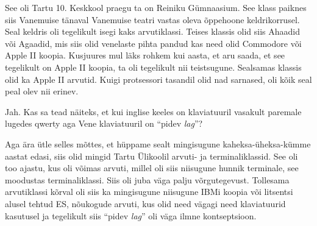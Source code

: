 See oli Tartu 10. Keskkool praegu ta on 
Reiniku Gümnaasium. See klass paiknes siis  Vanemuise tänaval Vanemuise teatri vastas 
oleva õppehoone keldrikorrusel. 
Seal keldris oli tegelikult isegi kaks arvutiklassi. Teises klassis olid siis 
Ahaadid või Agaadid, mis siis olid venelaste pihta pandud 
kas need olid Commodore  või Apple II koopia. Kusjuures mul läks rohkem kui aasta, et aru saada, et see tegelikult 
on Apple II koopia,  ta oli 
tegelikult nii teistsugune. Sealsamas klassis olid ka Apple 
II arvutid. Kuigi protsessori tasandil olid nad sarnased, 
oli  kõik seal peal olev nii erinev. 


Jah. Kas sa tead näiteks, et kui inglise keeles on klaviatuuril vasakult paremale lugedes 
qwerty aga Vene klaviatuuril on \enquote{pidev \emph{lag}}? 


Aga ära ütle selles mõttes, et hüppame sealt mingisugune kaheksa-üheksa-kümme 
aastat edasi, siis olid mingid Tartu Ülikoolil arvuti- ja 
terminaliklassid. See oli too ajastu, kus oli võimas arvuti, millel oli siis 
niisugune hunnik terminale, see moodustas terminaliklassi. Siis oli juba 
väga palju võrgutegevust. Tollesama arvutiklassi kõrval oli siis ka mingisugune 
niisugune IBMi koopia või litsentsi alusel tehtud ES, nõukogude arvuti, kus olid need 
vägagi need klaviatuurid kasutusel ja tegelikult siis \enquote{pidev 
\emph{lag}} oli väga ilmne kontseptsioon.

